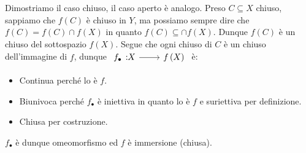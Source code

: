 \begin{demonstration}
Dimostriamo il caso chiuso, il caso aperto è analogo.
Preso $C\subseteq X$ chiuso, sappiamo che $f\left(C\right)$ è chiuso in $Y$, ma possiamo sempre dire che $f\left(C\right)=f\left(C\right)\cap f\left(X\right)$ in quanto $f\left(C\right)\subseteq \cap f\left(X\right)$. Dunque $f\left(C\right)$ è un chiuso del sottospazio $f\left(X\right)$. Segue che ogni chiuso di $C$ è un chiuso dell'immagine di $f$, dunque $\funz{f_{\bullet}}{X}{f\left(X\right)}$ è:
\begin{itemize}
\item Continua perché lo è $f$.
\item Biunivoca perché $f_{\bullet}$ è iniettiva in quanto lo è $f$ e suriettiva per definizione.
\item Chiusa per costruzione.
\end{itemize}
$f_{\bullet}$ è dunque omeomorfismo ed $f$ è immersione (chiusa).
\end{demonstration}
